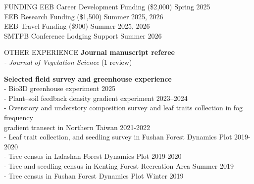 \documentclass{resume} %
\begin{document}
	\newpage
	\begin{rSection}{FUNDING}
		EEB Career Development Funding (\$2,000) \hfill{Spring 2025}\\
		EEB Research Funding (\$1,500) \hfill{Summer 2025, 2026}\\ 
		EEB Travel Funding (\$900) \hfill{Summer 2025, 2026}\\
		SMTPB Conference Lodging Support \hfill{Summer 2026}
	\end{rSection}

	
	\begin{rSection}{OTHER EXPERIENCE}
		\textbf{Journal manuscript referee}\\
		\textit{- Journal of Vegetation Science} (1 review)
		
		\textbf{Selected field survey and greenhouse experience}\\
		- Bio3D greenhouse experiment \hfill{2025}\\
		- Plant--soil feedback density gradient experiment \hfill{2023--2024}\\
		- Overstory and understory composition survey and leaf traits collection in fog frequency \\ \hspace*{0.5em} gradient transect in Northern Taiwan \hfill{2021-2022}\\
		- Leaf trait collection, and seedling survey in Fushan Forest Dynamics Plot \hfill{2019-2020}\\
		- Tree census in Lalashan Forest Dynamics Plot \hfill{2019-2020}\\
		- Tree and seedling census in Kenting Forest Recreation Area \hfill{Summer 2019}\\
		- Tree census in Fushan Forest Dynamics Plot \hfill{Winter 2019}
		
		
	\end{rSection}
	
\end{document}
